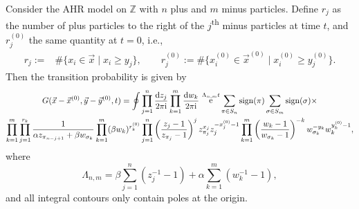 \documentclass[cmp]{svjour}
\numberwithin{theorem}{section}
\numberwithin{equation}{section}
\DeclareMathOperator{\e}{e}
\def\dd{{\rm d}}
\def\ii{{\rm i}}
\DeclareMathOperator{\sign}{sign}
\begin{document}
\begin{theorem}
\label{th:Green1}
Consider the AHR model on $\mathbb{Z}$ with $n$ plus and $m$ minus particles. Define $r_j$ as the number of plus particles to the right of the $j$\textsuperscript{th} minus particles at time $t$, and $r_j^{(0)}$ the same quantity at $t=0$, i.e.,
\begin{align*}
r_j:=&\#\{x_i\in\vec{x}\mid x_i \geq y_j\},\qquad
r_j^{(0)}:=\#\{x_i^{(0)}\in\vec{x}^{(0)}\mid x_i^{(0)} \geq y_j^{(0)}\}.
\end{align*} Then the transition probability is given by
\begin{multline}
G(\vec{x}-\vec{x}^{(0)},\vec{y}-\vec{y}^{(0)},t)
=
\oint
\prod_{j=1}^n \frac{\dd z_j }{2\pi \ii}
\prod_{k=1}^m \frac{\dd w_k }{2\pi \ii}\,
\e^{\Lambda_{n,m} t}
\sum_{\pi\in S_n} \sign(\pi) \sum_{\sigma\in S_m} \sign(\sigma) \times\\
\prod_{k=1}^{m}
\prod_{j=1}^{r_k}
\frac{1}{\alpha z_{\pi_{n-j+1}}+\beta w_{\sigma_k}}
\prod_{k=1}^{m}(\beta w_k)^{r_k^{(0)}}
\prod_{j=1}^n \left( \frac{z_j-1}{z_{\pi_j}-1}\right)^{j} z_{\pi_j}^{x_j} z_{j}^{-x^{(0)}_j-1}
\prod_{k=1}^m  \left( \frac{w_k-1}{w_{\sigma_k}-1}\right)^{-k}  w_{\sigma_k}^{-y_k} w_{k}^{y^{(0)}_k-1},
\label{Green function}
\end{multline}
where
\begin{equation}
\label{eigval}
\Lambda_{n,m}=\beta \sum_{j=1}^n (z_j^{-1}-1) + \alpha \sum_{k=1}^m (w_k^{-1}-1),
\end{equation}
and all integral contours only contain poles at the origin.
\end{theorem}
\end{document}
